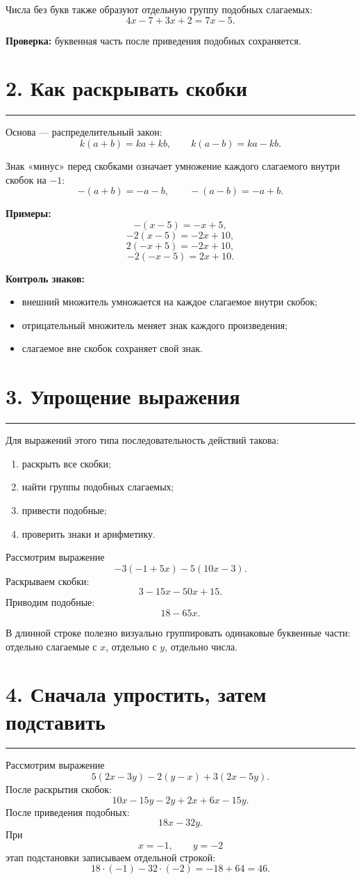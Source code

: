 \documentclass[a4paper,12pt]{article}
\newcommand{\topicline}{\par\noindent\color{accent}\rule{\linewidth}{0.6pt}\color{black}\par}
\begin{document}
Числа без букв также образуют отдельную группу подобных слагаемых:
\[
4x-7+3x+2=7x-5.
\]

\textbf{Проверка:} буквенная часть после приведения подобных сохраняется.

\section*{2. Как раскрывать скобки}
\topicline
Основа --- распределительный закон:
\[
k(a+b)=ka+kb,\qquad k(a-b)=ka-kb.
\]

Знак «минус» перед скобками означает умножение каждого слагаемого внутри скобок на $-1$:
\[
-(a+b)=-a-b,\qquad -(a-b)=-a+b.
\]

\textbf{Примеры:}
\[
-(x-5)=-x+5,
\]
\[
-2(x-5)=-2x+10,
\]
\[
2(-x+5)=-2x+10,
\]
\[
-2(-x-5)=2x+10.
\]

\textbf{Контроль знаков:}
\begin{itemize}
\item внешний множитель умножается на каждое слагаемое внутри скобок;
\item отрицательный множитель меняет знак каждого произведения;
\item слагаемое вне скобок сохраняет свой знак.
\end{itemize}

\section*{3. Упрощение выражения}
\topicline
Для выражений этого типа последовательность действий такова:
\begin{enumerate}
\item раскрыть все скобки;
\item найти группы подобных слагаемых;
\item привести подобные;
\item проверить знаки и арифметику.
\end{enumerate}

Рассмотрим выражение
\[
-3(-1+5x)-5(10x-3).
\]
Раскрываем скобки:
\[
3-15x-50x+15.
\]
Приводим подобные:
\[
18-65x.
\]

В длинной строке полезно визуально группировать одинаковые буквенные части: отдельно слагаемые с $x$, отдельно с $y$, отдельно числа.

\section*{4. Сначала упростить, затем подставить}
\topicline
Рассмотрим выражение
\[
5(2x-3y)-2(y-x)+3(2x-5y).
\]
После раскрытия скобок:
\[
10x-15y-2y+2x+6x-15y.
\]
После приведения подобных:
\[
18x-32y.
\]
При
\[
x=-1,\qquad y=-2
\]
этап подстановки записываем отдельной строкой:
\[
18\cdot(-1)-32\cdot(-2)=-18+64=46.
\]
\end{document}
